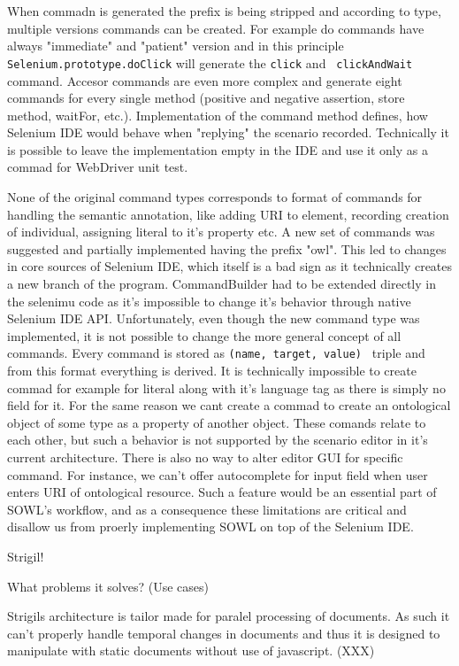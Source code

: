 When commadn is generated the prefix is being stripped and according to type,
multiple versions commands can be created. For example do commands have always
"immediate" and "patient" version and in this principle {\tt
Selenium.prototype.doClick} will generate the {\tt click} and {\tt
clickAndWait} command. Accesor commands are even more complex and generate
eight commands for every single method (positive and negative assertion, store
method, waitFor, etc.). Implementation of the command method defines, how
Selenium IDE would behave when "replying" the scenario recorded. Technically it
is possible to leave the implementation empty in the IDE and use it only as a
commad for WebDriver unit test. 

None of the original command types corresponds to format of commands for
handling the semantic annotation, like adding URI to element, recording
creation of individual, assigning literal to it's property etc. A new set of
commands was suggested and partially implemented having the prefix "owl". This
led to changes in core sources of Selenium IDE, which itself is a bad sign as
it technically creates a new branch of the program. CommandBuilder had to be
extended directly in the selenimu code as it's impossible to change it's
behavior through native Selenium IDE API. Unfortunately, even though the new
command type was implemented, it is not possible to change the more general
concept of all commands. Every command is stored as {\tt (name, target, value) }
triple and from this format everything is derived. It is technically impossible
to create commad for example for literal along with it's language tag as there
is simply no field for it. For the same reason we cant create a commad to
create an ontological object of some type as a property of another object.
These comands relate to each other, but such a behavior is not supported by the
scenario editor in it's current architecture. There is also no way to alter
editor GUI for specific command. For instance, we can't offer autocomplete for
input field when user enters URI of ontological resource. Such a feature would
be an essential part of SOWL's workflow, and as a consequence these limitations
are critical and disallow us from proerly implementing SOWL on top of the
Selenium IDE. 

\sec Strigil!


\secc What problems it solves? (Use cases)

Strigils architecture is tailor made for paralel processing of documents. As
such it can't properly handle temporal changes in documents and thus it is
designed to manipulate with static documents without use of javascript. (XXX)

